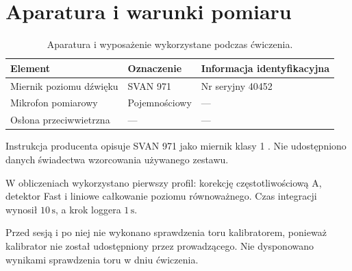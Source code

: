 \section{Aparatura i warunki pomiaru}
\label{sec:aparatura}
\begin{table}[H]
 \centering
 \caption{Aparatura i wyposażenie wykorzystane podczas ćwiczenia.}
 \label{tab:aparatura}
 \begin{tabularx}{\linewidth}{@{}L L L@{}}
 \toprule
 Element & Oznaczenie & Informacja identyfikacyjna \\
 \midrule
 Miernik poziomu dźwięku & SVAN 971 & Nr seryjny 40452 \\
 Mikrofon pomiarowy & Pojemnościowy & --- \\
 Osłona przeciwwietrzna & --- & --- \\
 \bottomrule
 \end{tabularx}
\end{table}
Instrukcja producenta opisuje SVAN 971 jako miernik klasy 1
\autocite{svan971-manual}. Nie udostępniono danych świadectwa
wzorcowania używanego zestawu.

W obliczeniach wykorzystano pierwszy profil: korekcję
częstotliwościową A, detektor Fast i liniowe całkowanie poziomu
równoważnego. Czas integracji wynosił $10\,\mathrm{s}$,
a krok loggera $1\,\mathrm{s}$.

Przed sesją i po niej nie wykonano sprawdzenia toru kalibratorem,
ponieważ kalibrator nie został udostępniony przez prowadzącego.
Nie dysponowano wynikami sprawdzenia toru w dniu ćwiczenia.

